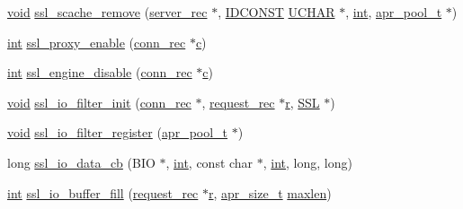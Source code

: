 \begin{DoxyCompactItemize}
\item 
\hyperlink{group__MOD__ISAPI_gacd6cdbf73df3d9eed42fa493d9b621a6}{void} \hyperlink{group__MOD__SSL__PRIVATE_ga6084ccd4ecd267bb63679204f6a2d770}{ssl\+\_\+scache\+\_\+remove} (\hyperlink{structserver__rec}{server\+\_\+rec} $\ast$, \hyperlink{group__MOD__SSL__PRIVATE_ga7b2aaacd57801ee8b4692b1699a1b1bd}{I\+D\+C\+O\+N\+ST} \hyperlink{group__MOD__SSL__PRIVATE_ga9a1dc6d243c6f75bb42f87e3f69649e4}{U\+C\+H\+AR} $\ast$, \hyperlink{pcre_8txt_a42dfa4ff673c82d8efe7144098fbc198}{int}, \hyperlink{structapr__pool__t}{apr\+\_\+pool\+\_\+t} $\ast$)
\item 
\hyperlink{pcre_8txt_a42dfa4ff673c82d8efe7144098fbc198}{int} \hyperlink{group__MOD__SSL__PRIVATE_ga91da4675ca466046f81ee17bee79c10d}{ssl\+\_\+proxy\+\_\+enable} (\hyperlink{structconn__rec}{conn\+\_\+rec} $\ast$\hyperlink{pcregrep_8txt_aef720ae5f62fa015619d00171d917416}{c})
\item 
\hyperlink{pcre_8txt_a42dfa4ff673c82d8efe7144098fbc198}{int} \hyperlink{group__MOD__SSL__PRIVATE_ga9e7bf408b385a57ebf50196312adb023}{ssl\+\_\+engine\+\_\+disable} (\hyperlink{structconn__rec}{conn\+\_\+rec} $\ast$\hyperlink{pcregrep_8txt_aef720ae5f62fa015619d00171d917416}{c})
\item 
\hyperlink{group__MOD__ISAPI_gacd6cdbf73df3d9eed42fa493d9b621a6}{void} \hyperlink{group__MOD__SSL__PRIVATE_gaaeb4e56b7b49e4a3865bfa20b13fc374}{ssl\+\_\+io\+\_\+filter\+\_\+init} (\hyperlink{structconn__rec}{conn\+\_\+rec} $\ast$, \hyperlink{structrequest__rec}{request\+\_\+rec} $\ast$\hyperlink{pcregrep_8txt_a2e9e9438b26c0bb4425367a7e4f75eb3}{r}, \hyperlink{group__MOD__SSL_gac05889312301718b3fc106564942ad68}{S\+SL} $\ast$)
\item 
\hyperlink{group__MOD__ISAPI_gacd6cdbf73df3d9eed42fa493d9b621a6}{void} \hyperlink{group__MOD__SSL__PRIVATE_ga7791817740c9ee192b3487d89278c162}{ssl\+\_\+io\+\_\+filter\+\_\+register} (\hyperlink{structapr__pool__t}{apr\+\_\+pool\+\_\+t} $\ast$)
\item 
long \hyperlink{group__MOD__SSL__PRIVATE_ga262f14fe40c8b29cd4444c40be780166}{ssl\+\_\+io\+\_\+data\+\_\+cb} (B\+IO $\ast$, \hyperlink{pcre_8txt_a42dfa4ff673c82d8efe7144098fbc198}{int}, const char $\ast$, \hyperlink{pcre_8txt_a42dfa4ff673c82d8efe7144098fbc198}{int}, long, long)
\item 
\hyperlink{pcre_8txt_a42dfa4ff673c82d8efe7144098fbc198}{int} \hyperlink{group__MOD__SSL__PRIVATE_gae9b480aadd01db006c92d9dbe84b8a07}{ssl\+\_\+io\+\_\+buffer\+\_\+fill} (\hyperlink{structrequest__rec}{request\+\_\+rec} $\ast$\hyperlink{pcregrep_8txt_a2e9e9438b26c0bb4425367a7e4f75eb3}{r}, \hyperlink{group__apr__platform_gaaa72b2253f6f3032cefea5712a27540e}{apr\+\_\+size\+\_\+t} \hyperlink{group__APACHE__CORE__VARBUF_gacf9683dcc597aebf09865b0853b88438}{maxlen})

\end{DoxyCompactItemize}
